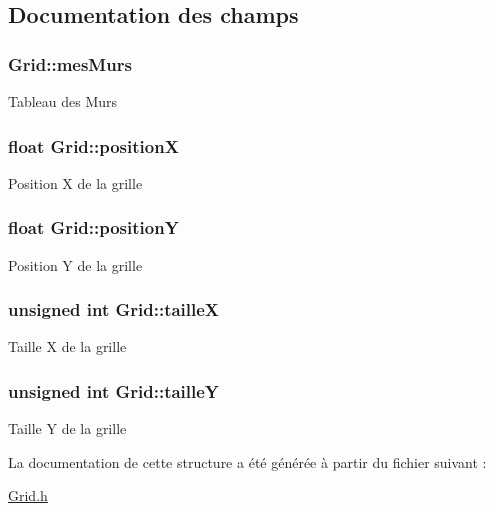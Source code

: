 \subsection{Documentation des champs}
\hypertarget{structGrid_a0462856a88311819d0422a08b9bb0033}{
\subsubsection[{mes\-Murs}]{ Grid\-::mes\-Murs}}\label{structGrid_a0462856a88311819d0422a08b9bb0033}
Tableau des Murs \hypertarget{structGrid_a1712b348175d1449f924218abc2c180b}{
\subsubsection[{position\-X}]{\setlength{\rightskip}{0pt plus 5cm}float Grid\-::position\-X}}\label{structGrid_a1712b348175d1449f924218abc2c180b}
Position X de la grille \hypertarget{structGrid_aa084d4ec2894df907e02718c88ab4060}{
\subsubsection[{position\-Y}]{\setlength{\rightskip}{0pt plus 5cm}float Grid\-::position\-Y}}\label{structGrid_aa084d4ec2894df907e02718c88ab4060}
Position Y de la grille \hypertarget{structGrid_ad6ec58066a6303fbc2aa5443840cf067}{
\subsubsection[{taille\-X}]{\setlength{\rightskip}{0pt plus 5cm}unsigned int Grid\-::taille\-X}}\label{structGrid_ad6ec58066a6303fbc2aa5443840cf067}
Taille X de la grille \hypertarget{structGrid_adc12ffc8da211af2444db8a2007e5a7d}{
\subsubsection[{taille\-Y}]{\setlength{\rightskip}{0pt plus 5cm}unsigned int Grid\-::taille\-Y}}\label{structGrid_adc12ffc8da211af2444db8a2007e5a7d}
Taille Y de la grille 

La documentation de cette structure a été générée à partir du fichier suivant \-:\begin{DoxyCompactItemize}
\item 
\hyperlink{Grid_8h}{Grid.\-h}\end{DoxyCompactItemize}
